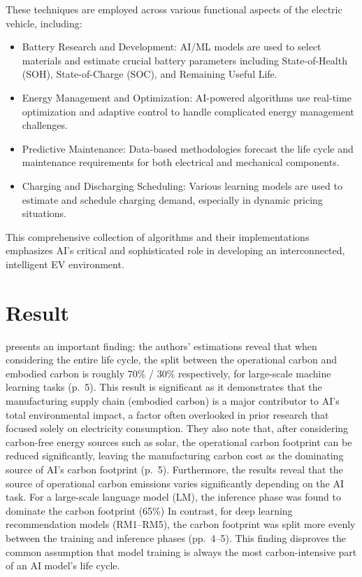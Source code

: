 \documentclass[a4paper, 12pt]{article}
\begin{document}
These techniques are employed across various functional aspects of the electric vehicle, including:
\begin{itemize}
    \item Battery Research and Development: AI/ML models are used to select materials and estimate crucial battery parameters including State-of-Health (SOH), State-of-Charge (SOC), and Remaining Useful Life.

    \item Energy Management and Optimization: AI-powered algorithms use real-time optimization and adaptive control to handle complicated energy management challenges.

    \item Predictive Maintenance: Data-based methodologies forecast the life cycle and maintenance requirements for both electrical and mechanical components.

    \item Charging and Discharging Scheduling: Various learning models are used to estimate and schedule charging demand, especially in dynamic pricing situations.
\end{itemize}
This comprehensive collection of algorithms and their implementations emphasizes AI's critical and sophisticated role in developing an interconnected, intelligent EV environment.

\section{Result}
\citet{Wu2022} presents an important finding: the authors' estimations reveal that when considering the entire life cycle, the split between the operational carbon and embodied carbon is roughly 70\% / 30\% respectively, for large-scale machine learning tasks (p.~5). This result is significant as it demonstrates that the manufacturing supply chain (embodied carbon) is a major contributor to AI's total environmental impact, a factor often overlooked in prior research that focused solely on electricity consumption. They also note that, after considering carbon-free energy sources such as solar, the operational carbon footprint can be reduced significantly, leaving the manufacturing carbon cost as the dominating source of AI's carbon footprint (p.~5). Furthermore, the results reveal that the source of operational carbon emissions varies significantly depending on the AI task. For a large-scale language model (LM), the inference phase was found to dominate the carbon footprint (65\%) In contrast, for deep learning recommendation models (RM1–RM5), the carbon footprint was split more evenly between the training and inference phases (pp.~4--5). This finding disproves the common assumption that model training is always the most carbon-intensive part of an AI model's life cycle.\hfill \break
\end{document}
